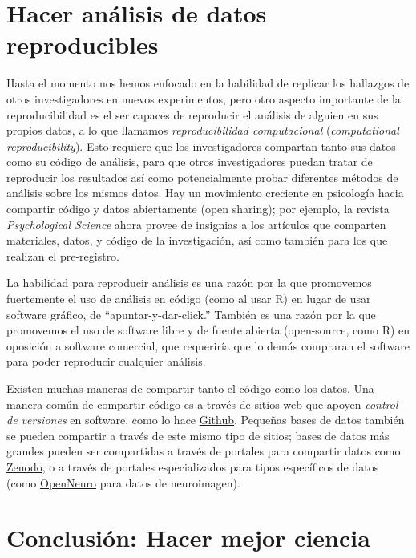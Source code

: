 \documentclass[
  12pt,
]{book}
\begin{document}
\hypertarget{hacer-anuxe1lisis-de-datos-reproducibles}{%
\section{Hacer análisis de datos reproducibles}\label{hacer-anuxe1lisis-de-datos-reproducibles}}

Hasta el momento nos hemos enfocado en la habilidad de replicar los hallazgos de otros investigadores en nuevos experimentos, pero otro aspecto importante de la reproducibilidad es el ser capaces de reproducir el análisis de alguien en sus propios datos, a lo que llamamos \emph{reproducibilidad computacional} (\emph{computational reproducibility}). Esto requiere que los investigadores compartan tanto sus datos como su código de análisis, para que otros investigadores puedan tratar de reproducir los resultados así como potencialmente probar diferentes métodos de análisis sobre los mismos datos. Hay un movimiento creciente en psicología hacia compartir código y datos abiertamente (open sharing); por ejemplo, la revista \emph{Psychological Science} ahora provee de insignias a los artículos que comparten materiales, datos, y código de la investigación, así como también para los que realizan el pre-registro.

La habilidad para reproducir análisis es una razón por la que promovemos fuertemente el uso de análisis en código (como al usar R) en lugar de usar software gráfico, de ``apuntar-y-dar-click.'' También es una razón por la que promovemos el uso de software libre y de fuente abierta (open-source, como R) en oposición a software comercial, que requeriría que lo demás compraran el software para poder reproducir cualquier análisis.

Existen muchas maneras de compartir tanto el código como los datos. Una manera común de compartir código es a través de sitios web que apoyen \emph{control de versiones} en software, como lo hace \href{http://github.com}{Github}. Pequeñas bases de datos también se pueden compartir a través de este mismo tipo de sitios; bases de datos más grandes pueden ser compartidas a través de portales para compartir datos como \href{https://zenodo.org/}{Zenodo}, o a través de portales especializados para tipos específicos de datos (como \href{http://openneuro.org}{OpenNeuro} para datos de neuroimagen).

\hypertarget{conclusiuxf3n-hacer-mejor-ciencia}{%
\section{Conclusión: Hacer mejor ciencia}\label{conclusiuxf3n-hacer-mejor-ciencia}}
\end{document}
